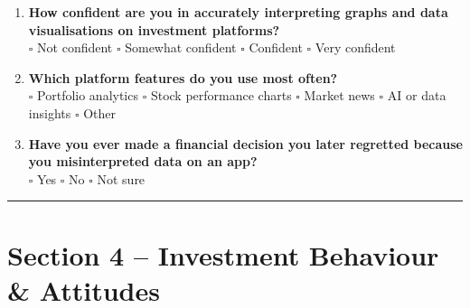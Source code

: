 \documentclass[11pt,english]{article}
\begin{document}
\begin{enumerate}[resume,leftmargin=1.5em,label=\textbf{\arabic*.}]
\item \textbf{How confident are you in accurately interpreting graphs and data visualisations on investment platforms?} \\
$\square$ Not confident \quad $\square$ Somewhat confident \quad $\square$ Confident \quad $\square$ Very confident

\item \textbf{Which platform features do you use most often?} \\
$\square$ Portfolio analytics \quad $\square$ Stock performance charts \quad $\square$ Market news \quad $\square$ AI or data insights \quad $\square$ Other

\item \textbf{Have you ever made a financial decision you later regretted because you misinterpreted data on an app?} \\
$\square$ Yes \quad $\square$ No \quad $\square$ Not sure
\end{enumerate}

\vspace{0.5em}
\hrule
\vspace{0.8em}

\section*{Section 4 – Investment Behaviour \& Attitudes}
\end{document}
